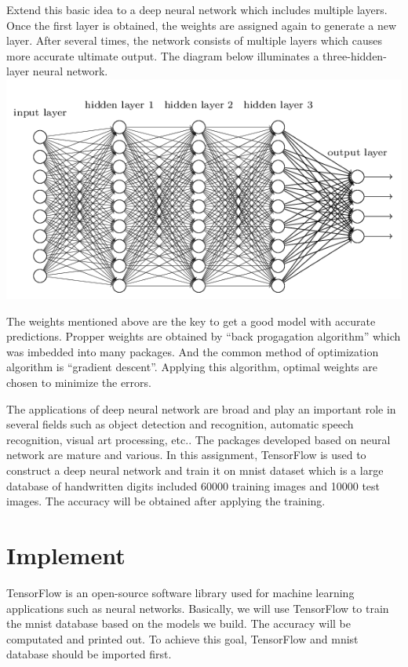 \documentclass[11pt]{article}
\makeatletter
\def\maxwidth{\ifdim\Gin@nat@width>\linewidth\linewidth
    \else\Gin@nat@width\fi}
\let\Oldincludegraphics\includegraphics
\renewcommand{\includegraphics}[1]{\Oldincludegraphics[width=.8\maxwidth]{#1}}
\makeatother
\begin{document}
Extend this basic idea to a deep neural network which includes multiple
layers. Once the first layer is obtained, the weights are assigned again
to generate a new layer. After several times, the network consists of
multiple layers which causes more accurate ultimate output. The diagram
below illuminates a three-hidden-layer neural network.
\includegraphics{dnn.png}

The weights mentioned above are the key to get a good model with
accurate predictions. Propper weights are obtained by ``back progagation
algorithm'' which was imbedded into many packages. And the common method
of optimization algorithm is ``gradient descent''. Applying this
algorithm, optimal weights are chosen to minimize the errors.

The applications of deep neural network are broad and play an important
role in several fields such as object detection and recognition,
automatic speech recognition, visual art processing, etc.. The packages
developed based on neural network are mature and various. In this
assignment, TensorFlow is used to construct a deep neural network and
train it on mnist dataset which is a large database of handwritten
digits included 60000 training images and 10000 test images. The
accuracy will be obtained after applying the training.

    \hypertarget{implement}{%
\section{Implement}\label{implement}}

    TensorFlow is an open-source software library used for machine learning
applications such as neural networks. Basically, we will use TensorFlow
to train the mnist database based on the models we build. The accuracy
will be computated and printed out. To achieve this goal, TensorFlow and
mnist database should be imported first.
\end{document}
